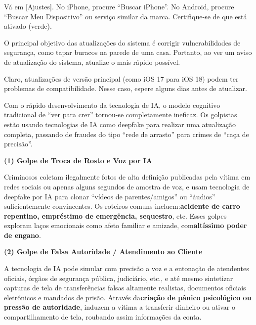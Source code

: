 Vá em [Ajustes]. No iPhone, procure “Buscar iPhone”. No Android, procure “Buscar Meu Dispositivo” ou serviço similar da marca. Certifique-se de que está ativado (verde).


O principal objetivo das atualizações do sistema é corrigir vulnerabilidades de segurança, como tapar buracos na parede de uma casa. Portanto, ao ver um aviso de atualização do sistema, atualize o mais rápido possível.

Claro, atualizações de versão principal (como iOS 17 para iOS 18) podem ter problemas de compatibilidade. Nesse caso, espere alguns dias antes de atualizar.


Com o rápido desenvolvimento da tecnologia de IA, o modelo cognitivo tradicional de “ver para crer” tornou-se completamente ineficaz. Os golpistas estão usando tecnologias de IA como deepfake para realizar uma atualização completa, passando de fraudes do tipo “rede de arrasto” para crimes de “caça de precisão”.


\textbf{(1) Golpe de Troca de Rosto e Voz por IA}\par

Criminosos coletam ilegalmente fotos de alta definição publicadas pela vítima em redes sociais ou apenas alguns segundos de amostra de voz, e usam tecnologia de deepfake por IA para clonar “vídeos de parentes/amigos” ou “áudios” suficientemente convincentes. Os roteiros comuns incluem:\textbf{acidente de carro repentino, empréstimo de emergência, sequestro}, etc. Esses golpes exploram laços emocionais como afeto familiar e amizade, com\textbf{altíssimo poder de engano}.

\textbf{(2) Golpe de Falsa Autoridade / Atendimento ao Cliente}\par

A tecnologia de IA pode simular com precisão a voz e a entonação de atendentes oficiais, órgãos de segurança pública, judiciário, etc., e até mesmo sintetizar capturas de tela de transferências falsas altamente realistas, documentos oficiais eletrônicos e mandados de prisão. Através da\textbf{criação de pânico psicológico ou pressão de autoridade}, induzem a vítima a transferir dinheiro ou ativar o compartilhamento de tela, roubando assim informações da conta.


